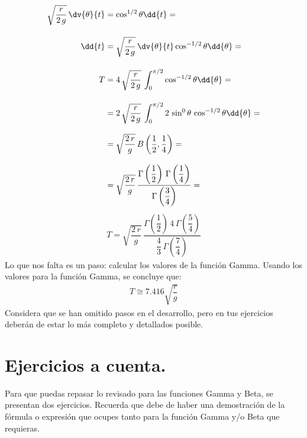 \begin{align*}
\sqrt{\dfrac{r}{2 \, g}} \, \dv{\theta}{t} &= \cos^{1/2} \theta \dd{t} = \\[1em]
\dd{t} &= \sqrt{\dfrac{r}{2 \, g}} \, \dv{\theta}{t} \cos^{-1/2} \theta \dd{\theta} = \\[1em]
T &= 4 \, \sqrt{\dfrac{r}{2 \, g}} \, \int_{0}^{\pi/2} \cos^{-1/2} \theta \dd{\theta} = \\[1em]
&= 2 \, \sqrt{\dfrac{r}{2 \, g}} \, \int_{0}^{\pi/2} 2 \, \sin^{0} \theta \, \cos^{-1/2} \theta \dd{\theta} = \\[0.8em]
&= \sqrt{\dfrac{2 \, r}{g}} \, B \left( \dfrac{1}{2}, \dfrac{1}{4} \right) = \\[0.8em]
&= \sqrt{\dfrac{2 \, r}{g}} \, \dfrac{\Gamma \left(\dfrac{1}{2} \right) \, \Gamma \left(\dfrac{1}{4} \right)}{\Gamma \left(\dfrac{3}{4} \right)} = 
\end{align*}
\endgroup
\begin{align*}
T = \sqrt{\dfrac{2 \, r}{g}} \, \dfrac{\Gamma \left(\dfrac{1}{2} \right) \, 4 \, \Gamma \left(\dfrac{5}{4} \right)}{\dfrac{4}{3} \, \Gamma \left(\dfrac{7}{4} \right)}
\end{align*}
Lo que nos falta es un paso: calcular los valores de la función Gamma. Usando los valores para la función Gamma, se concluye que:
\begin{align*}
T \cong 7.416 \sqrt{\dfrac{r}{g}}
\end{align*}
Considera que se han omitido pasos en el desarrollo, pero en tus ejercicios deberán de estar lo más completo y detallados posible.

\section{Ejercicios a cuenta.}

Para que puedas repasar lo revisado para las funciones Gamma y Beta, se presentan dos ejercicios. Recuerda que debe de haber una demostración de la fórmula o expresión que ocupes tanto para la función Gamma y/o Beta que requieras.

